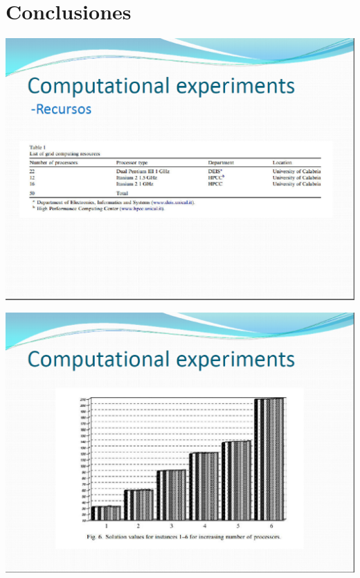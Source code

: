 \documentclass[spanish,a4paper,11pt,twoside]{report}
\begin{document}
\chapter{Conclusiones}
\label{chapter:conclusiones}


\begin{center}
\includegraphics[width=1\textwidth]{images/pic13.eps}\\[0.25cm]
\end{center}
\begin{center}
\includegraphics[width=1\textwidth]{images/pic14.eps}\\[0.25cm]
\end{center}
\thispagestyle{empty}
\end{document}
